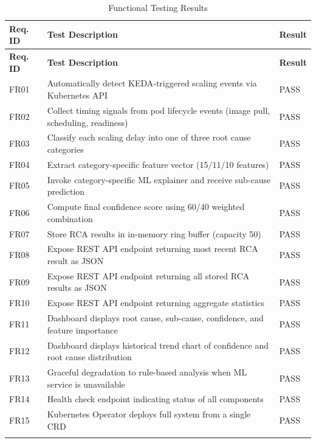 \begin{xltabular}{\textwidth}{|p{1.5cm}|X|p{2cm}|}

\hline
\textbf{Req. ID} & \textbf{Test Description} & \textbf{Result} \\ \hline
\endfirsthead

\hline
\textbf{Req. ID} & \textbf{Test Description} & \textbf{Result} \\ \hline
\endhead

FR01 & Automatically detect KEDA-triggered scaling events via Kubernetes API & PASS \\ \hline
FR02 & Collect timing signals from pod lifecycle events (image pull, scheduling, readiness) & PASS \\ \hline
FR03 & Classify each scaling delay into one of three root cause categories & PASS \\ \hline
FR04 & Extract category-specific feature vector (15/11/10 features) & PASS \\ \hline
FR05 & Invoke category-specific ML explainer and receive sub-cause prediction & PASS \\ \hline
FR06 & Compute final confidence score using 60/40 weighted combination & PASS \\ \hline
FR07 & Store RCA results in in-memory ring buffer (capacity 50) & PASS \\ \hline
FR08 & Expose REST API endpoint returning most recent RCA result as JSON & PASS \\ \hline
FR09 & Expose REST API endpoint returning all stored RCA results as JSON & PASS \\ \hline
FR10 & Expose REST API endpoint returning aggregate statistics & PASS \\ \hline
FR11 & Dashboard displays root cause, sub-cause, confidence, and feature importance & PASS \\ \hline
FR12 & Dashboard displays historical trend chart of confidence and root cause distribution & PASS \\ \hline
FR13 & Graceful degradation to rule-based analysis when ML service is unavailable & PASS \\ \hline
FR14 & Health check endpoint indicating status of all components & PASS \\ \hline
FR15 & Kubernetes Operator deploys full system from a single CRD & PASS \\ \hline

\caption{Functional Testing Results}
\label{tab:functional_testing}
\end{xltabular}

